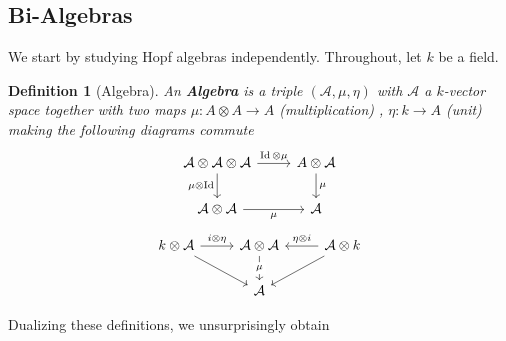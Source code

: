 \documentclass[11pt, a4paper]{article}
\DeclareMathOperator*{\id}{Id}
\newtheorem{defn}{Definition}
\theoremstyle{plain}
\begin{document}
\subsection{Bi-Algebras}
We start by studying Hopf algebras independently. 
Throughout, let $k$ be a field.
\begin{defn}[Algebra]
	An \textbf{Algebra} is a triple $\left( \mathcal{A},\mu, \eta\right) $ with $\mathcal{A}$ a $k$-vector space together with two maps   $\mu\colon A\otimes A \to A$ (multiplication) , $\eta\colon k \to A$ (unit)  making the following diagrams commute
\[\begin{tikzcd}
	{\mathcal{A} \otimes \mathcal{A}\otimes \mathcal{A}} & {A\otimes \mathcal{A}} \\
	{\mathcal{A}\otimes \mathcal{A}} & {\mathcal{A}}
	\arrow["\id\otimes\mu", from=1-1, to=1-2]
	\arrow["\mu", from=1-2, to=2-2]
	\arrow["\mu"', from=2-1, to=2-2]
	\arrow["{\mu\otimes \id}"', from=1-1, to=2-1]
\end{tikzcd}\]
\[\begin{tikzcd}
	{k\otimes \mathcal{A}} & {\mathcal{A}\otimes\mathcal{A}} & {\mathcal{A}\otimes k} \\
	& {\mathcal{A}}
	\arrow["{\eta\otimes i}"', from=1-3, to=1-2]
	\arrow["i\otimes\eta", from=1-1, to=1-2]
	\arrow[from=1-1, to=2-2]
	\arrow[from=1-3, to=2-2]
	\arrow["\mu"{description}, from=1-2, to=2-2]
\end{tikzcd}\]
\end{defn}
Dualizing these definitions, we unsurprisingly obtain
\end{document}
